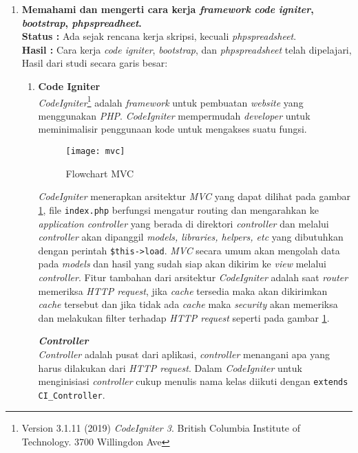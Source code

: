 \documentclass[a4paper,twoside]{article}
\begin{document}
\begin{enumerate}
	\item \textbf{Memahami dan mengerti cara kerja \textit{framework} \textit{code igniter}, \textit{bootstrap}, \textit{phpspreadheet}.}\\
	{\bf Status :} Ada sejak rencana kerja skripsi, kecuali \textit{phpspreadsheet}.\\
	{\bf Hasil :} Cara kerja \textit{code igniter}, \textit{bootstrap}, dan \textit{phpspreadsheet} telah dipelajari, Hasil dari studi secara garis besar:
	\begin{enumerate}
		\item \textbf{Code Igniter} \\
		\textit{CodeIgniter}\footnote{Version 3.1.11 (2019) \textit{CodeIgniter 3}. British Columbia Institute of Technology. 3700 Willingdon Ave} adalah \textit{framework} untuk pembuatan \textit{website} yang menggunakan \textit{PHP}. \textit{CodeIgniter} mempermudah \textit{developer} untuk meminimalisir penggunaan kode untuk mengakses suatu fungsi.
		
		\begin{figure}[H]
			\centering
			\texttt{[image: mvc]} 
			\caption{Flowchart MVC}
			\label{fig:appflowchart} 
		\end{figure}
				
		 \textit{CodeIgniter} menerapkan arsitektur \textit{MVC} yang dapat dilihat pada gambar \ref{fig:appflowchart}, file \texttt{index.php} berfungsi mengatur routing dan mengarahkan ke \textit{application controller} yang berada di direktori \textit{controller} dan melalui \textit{controller} akan dipanggil \textit{models, libraries, helpers, etc} yang dibutuhkan dengan perintah \texttt{\$this->load}. \textit{MVC} secara umum akan mengolah data pada \textit{models} dan hasil yang sudah siap akan dikirim ke \textit{view} melalui \textit{controller}. Fitur tambahan dari arsitektur \textit{CodeIgniter} adalah saat \textit{router} memeriksa \textit{HTTP request}, jika \textit{cache} tersedia maka akan dikirimkan \textit{cache} tersebut dan jika tidak ada \textit{cache} maka \textit{security} akan memeriksa dan melakukan filter terhadap \textit{HTTP request} seperti pada gambar \ref{fig:appflowchart}. 
		 
		 \textbf{\textit{Controller}} \\
		 \textit{Controller} adalah pusat dari aplikasi, \textit{controller} menangani apa yang harus dilakukan dari \textit{HTTP request}. Dalam \textit{CodeIgniter} untuk menginisiasi \textit{controller} cukup menulis nama kelas diikuti dengan \texttt{extends CI\_Controller}.
		 

\end{enumerate}
\end{enumerate}
\end{document}
